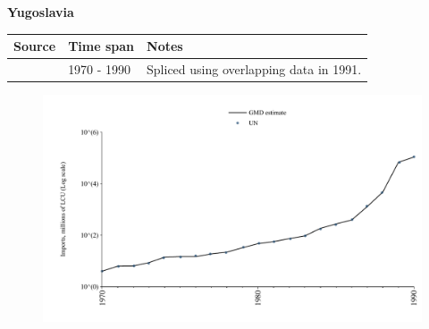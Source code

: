 \documentclass[12pt,a4paper,landscape]{article}
\begin{document}
\begin{adjustbox}{max totalsize={\paperwidth}{\paperheight},center}
\begin{minipage}[t][\textheight][t]{\textwidth}
\vspace*{0.5cm}
{}
\begin{center}
{\Large\bfseries Yugoslavia}
\end{center}
\vspace{0.5cm}
\begin{table}[H]
\centering
\small
\begin{tabular}{|l|l|l|}
\hline
\textbf{Source} & \textbf{Time span} & \textbf{Notes} \\
\hline
\rowcolor{white}\cite{UN}& 1970 - 1990 &Spliced using overlapping data in 1991.\\
\hline
\end{tabular}
\end{table}
\begin{figure}[H]
\centering
\includegraphics[width=\textwidth,height=0.6\textheight,keepaspectratio]{graphs/YUG_imports.pdf}
\end{figure}
\end{minipage}
\end{adjustbox}
\end{document}
